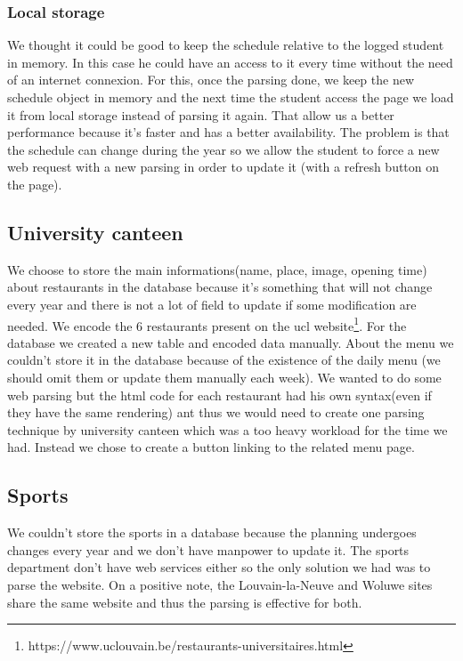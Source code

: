 \documentclass[11pt, a4paper]{report}
\begin{document}
\subsubsection{Local storage}
We thought it could be good to keep the schedule relative to the logged student in memory. In this case he could have an access to it every time without the need of an internet connexion. For this, once the parsing done, we keep the new schedule object in memory and the next time the student access the page we load it from local storage instead of parsing it again. That allow us a better performance because it's faster and has a better availability. The problem is that the schedule can change during the year so we allow the student to force a new web request with a new parsing in order to update it (with a refresh button on the page).

\subsection{University canteen}
We choose to store the main informations(name, place, image, opening time) about restaurants in the database because it's  something that will not change every year and there is not a lot of field to update if some modification are needed. We encode the 6 restaurants present on the ucl website\footnote{https://www.uclouvain.be/restaurants-universitaires.html}. For the database we created a new table and encoded data manually. About the menu we couldn't store it in the database because of the existence of the daily menu (we should omit them or update them manually each week). We wanted to do some web parsing but the html code for each restaurant had his own syntax(even if they have the same rendering) ant thus we would need to create one parsing technique by university canteen which was a too heavy workload for the time we had. Instead we chose to create a button linking to the related menu page.
\subsection{Sports}
We couldn't store the sports in a database because the planning undergoes changes every year and we don't have manpower to update it. The sports department don't have web services either so the only solution we had was to parse the website. On a positive note, the Louvain-la-Neuve and Woluwe sites share the same website and thus the parsing is effective for both. 
\end{document}
